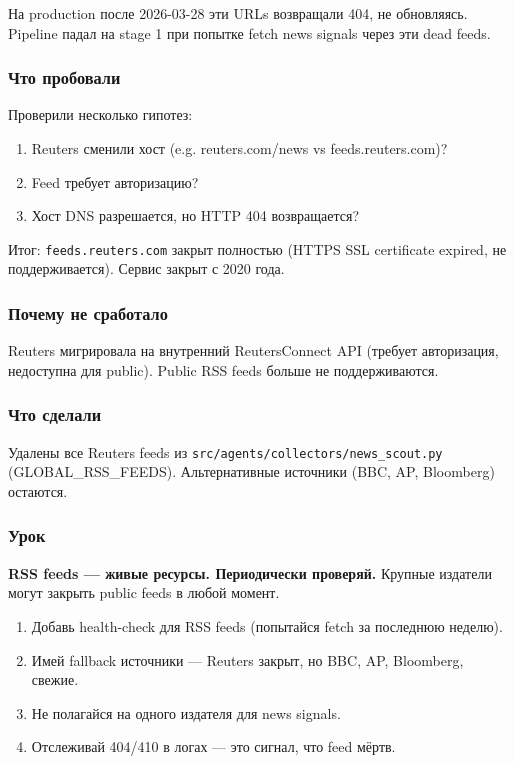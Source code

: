 На production после 2026-03-28 эти URLs возвращали 404, не обновляясь. Pipeline падал на stage 1 при попытке fetch news signals через эти dead feeds.

\subsubsection*{Что пробовали}
Проверили несколько гипотез:
\begin{enumerate}
\item Reuters сменили хост (e.g. reuters.com/news vs feeds.reuters.com)?
\item Feed требует авторизацию?
\item Хост DNS разрешается, но HTTP 404 возвращается?
\end{enumerate}

Итог: \texttt{feeds.reuters.com} закрыт полностью (HTTPS SSL certificate expired, не поддерживается). Сервис закрыт с 2020 года.

\subsubsection*{Почему не сработало}
Reuters мигрировала на внутренний ReutersConnect API (требует авторизация, недоступна для public). Public RSS feeds больше не поддерживаются.

\subsubsection*{Что сделали}
Удалены все Reuters feeds из \texttt{src/agents/collectors/news\_scout.py} (GLOBAL\_RSS\_FEEDS). Альтернативные источники (BBC, AP, Bloomberg) остаются.

\subsubsection*{Урок}
\textbf{RSS feeds --- живые ресурсы. Периодически проверяй.} Крупные издатели могут закрыть public feeds в любой момент.

\begin{enumerate}
\item Добавь health-check для RSS feeds (попытайся fetch за последнюю неделю).
\item Имей fallback источники --- Reuters закрыт, но BBC, AP, Bloomberg, свежие.
\item Не полагайся на одного издателя для news signals.
\item Отслеживай 404/410 в логах --- это сигнал, что feed мёртв.
\end{enumerate}

